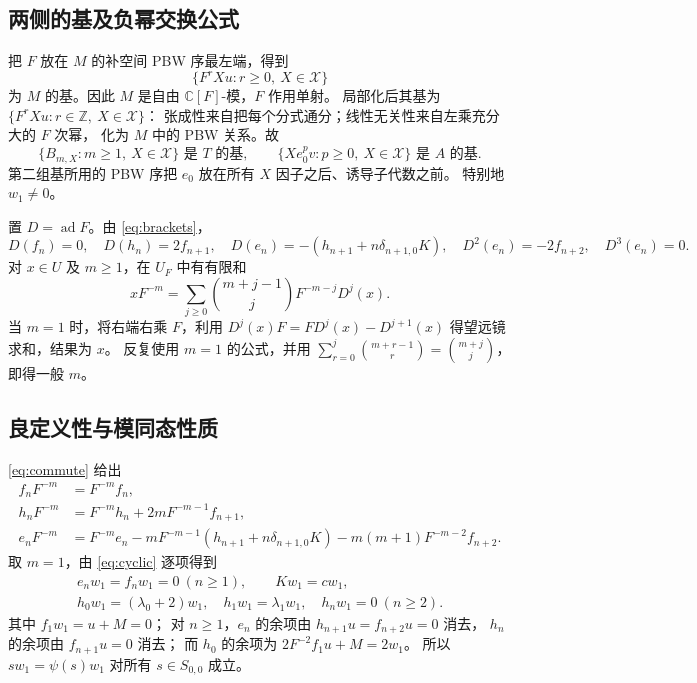 \documentclass[UTF8,11pt]{ctexart}
\newcommand{\C}{\mathbb C}
\newcommand{\Z}{\mathbb Z}
\newcommand{\ad}{\operatorname{ad}}
\theoremstyle{definition}
\begin{document}
\subsection{两侧的基及负幂交换公式}

把 \(F\) 放在 \(M\) 的补空间 PBW 序最左端，得到
\[
 \{F^rXu:r\ge0,\ X\in\mathcal X\}
\]
为 \(M\) 的基。因此 \(M\) 是自由 \(\C[F]\)-模，\(F\) 作用单射。
局部化后其基为 \(\{F^rXu:r\in\Z,\ X\in\mathcal X\}\)：
张成性来自把每个分式通分；线性无关性来自左乘充分大的 \(F\) 次幂，
化为 \(M\) 中的 PBW 关系。故
\begin{equation}\label{eq:bases}
 \{B_{m,X}:m\ge1,\ X\in\mathcal X\}\text{ 是 }T\text{ 的基},\qquad
 \{Xe_0^pv:p\ge0,\ X\in\mathcal X\}\text{ 是 }A\text{ 的基}.
\end{equation}
第二组基所用的 PBW 序把 \(e_0\) 放在所有 \(X\) 因子之后、诱导子代数之前。
特别地 \(w_1\ne0\)。

置 \(D=\ad F\)。由 \eqref{eq:brackets}，
\[
 D(f_n)=0,\quad D(h_n)=2f_{n+1},\quad
 D(e_n)=-(h_{n+1}+n\delta_{n+1,0}K),\quad
 D^2(e_n)=-2f_{n+2},\quad D^3(e_n)=0.
\]
对 \(x\in U\) 及 \(m\ge1\)，在 \(U_F\) 中有有限和
\begin{equation}\label{eq:commute}
 xF^{-m}
   =\sum_{j\ge0}\binom{m+j-1}{j}F^{-m-j}D^j(x).
\end{equation}
当 \(m=1\) 时，将右端右乘 \(F\)，利用
\(D^j(x)F=FD^j(x)-D^{j+1}(x)\) 得望远镜求和，结果为 \(x\)。
反复使用 \(m=1\) 的公式，并用
\(\sum_{r=0}^j\binom{m+r-1}{r}=\binom{m+j}{j}\)，即得一般 \(m\)。

\subsection{良定义性与模同态性质}

\eqref{eq:commute} 给出
\begin{equation}\label{eq:actions}
\begin{aligned}
 f_nF^{-m}&=F^{-m}f_n,\\
 h_nF^{-m}&=F^{-m}h_n+2mF^{-m-1}f_{n+1},\\
 e_nF^{-m}&=F^{-m}e_n
   -mF^{-m-1}(h_{n+1}+n\delta_{n+1,0}K)
   -m(m+1)F^{-m-2}f_{n+2}.
\end{aligned}
\end{equation}
取 \(m=1\)，由 \eqref{eq:cyclic} 逐项得到
\[
\begin{gathered}
 e_nw_1=f_nw_1=0\ (n\ge1),\qquad Kw_1=cw_1,\\
 h_0w_1=(\lambda_0+2)w_1,\quad h_1w_1=\lambda_1w_1,\quad
 h_nw_1=0\ (n\ge2).
\end{gathered}
\]
其中 \(f_1w_1=u+M=0\)；
对 \(n\ge1\)，\(e_n\) 的余项由 \(h_{n+1}u=f_{n+2}u=0\) 消去，
\(h_n\) 的余项由 \(f_{n+1}u=0\) 消去；
而 \(h_0\) 的余项为 \(2F^{-2}f_1u+M=2w_1\)。
所以 \(sw_1=\psi(s)w_1\) 对所有 \(s\in S_{0,0}\) 成立。
\end{document}
